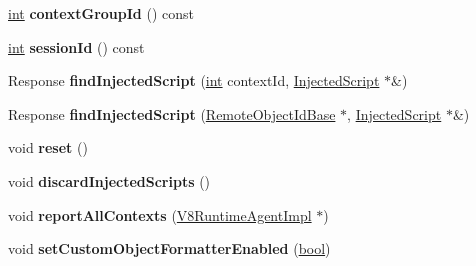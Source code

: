 \begin{DoxyCompactItemize}
\mbox{\hyperlink{classint}{int}} {\bfseries context\+Group\+Id} () const
\item 
\mbox{\label{classv8__inspector_1_1V8InspectorSessionImpl_a860d4ddb6043f7dfe9ef8968a475bb95}} 
\mbox{\hyperlink{classint}{int}} {\bfseries session\+Id} () const
\item 
\mbox{\label{classv8__inspector_1_1V8InspectorSessionImpl_a384bbebc2f73baf2016f7c071ce8ce7c}} 
Response {\bfseries find\+Injected\+Script} (\mbox{\hyperlink{classint}{int}} context\+Id, \mbox{\hyperlink{classv8__inspector_1_1InjectedScript}{Injected\+Script}} $\ast$\&)
\item 
\mbox{\label{classv8__inspector_1_1V8InspectorSessionImpl_ad39c1e532cd7ca8035f1114ecdc663c3}} 
Response {\bfseries find\+Injected\+Script} (\mbox{\hyperlink{classv8__inspector_1_1RemoteObjectIdBase}{Remote\+Object\+Id\+Base}} $\ast$, \mbox{\hyperlink{classv8__inspector_1_1InjectedScript}{Injected\+Script}} $\ast$\&)
\item 
\mbox{\label{classv8__inspector_1_1V8InspectorSessionImpl_a1755db5e3ef9f086d9537d8990cd19c5}} 
void {\bfseries reset} ()
\item 
\mbox{\label{classv8__inspector_1_1V8InspectorSessionImpl_abd16d965cc8b56c31d3067dad65cc5fc}} 
void {\bfseries discard\+Injected\+Scripts} ()
\item 
\mbox{\label{classv8__inspector_1_1V8InspectorSessionImpl_ae79b1ea64009b3ec5f9bd5346566444a}} 
void {\bfseries report\+All\+Contexts} (\mbox{\hyperlink{classv8__inspector_1_1V8RuntimeAgentImpl}{V8\+Runtime\+Agent\+Impl}} $\ast$)
\item 
\mbox{\label{classv8__inspector_1_1V8InspectorSessionImpl_aa4365dda3f50b5d7dc449ed8bdfbd3ae}} 
void {\bfseries set\+Custom\+Object\+Formatter\+Enabled} (\mbox{\hyperlink{classbool}{bool}})
\item 
\mbox{\label{classv8__inspector_1_1V8InspectorSessionImpl_a7f61332c57b7f55612f4f611a0804607}} 

\end{DoxyCompactItemize}
